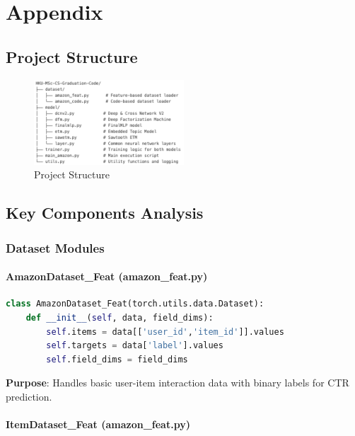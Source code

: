 \chapter{Appendix} %
\label{AppendixA} %

\section{Project Structure}

\begin{figure}[htbp]
    \centering
    \includegraphics[width=0.5\textwidth]{Figures/proj_structure.png}
    \caption{Project Structure}
    \label{fig:proj_structure}
\end{figure}

\section{Key Components Analysis}

\subsection{Dataset Modules}

\subsubsection{AmazonDataset\_Feat (amazon\_feat.py)}

\begin{lstlisting}[language=Python, caption=Amazon Dataset Implementation]
class AmazonDataset_Feat(torch.utils.data.Dataset):
    def __init__(self, data, field_dims):
        self.items = data[['user_id','item_id']].values
        self.targets = data['label'].values
        self.field_dims = field_dims
\end{lstlisting}

\textbf{Purpose}: Handles basic user-item interaction data with binary labels for CTR prediction.

\subsubsection{ItemDataset\_Feat (amazon\_feat.py)}

